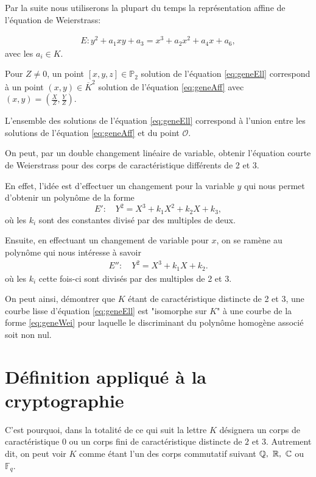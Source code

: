 Par la suite nous utiliserons la plupart du temps la représentation affine de
l'équation de Weierstrass:

\begin{align*}
    \label{eq:geneAff}
E : y^2 + a_1xy + a_3 = x^3 +a_2x^2+a_4x+a_6
,\end{align*}
avec les $a_{i} \in K$. 

Pour $Z \neq 0$, un point $[x,y,z] \in \mathbb{P}_{2}$ solution de l'équation
\eqref{eq:geneEll} correspond à un point $(x,y) \in \overline{K}^2$ solution de
l'équation \eqref{eq:geneAff} avec $(x,y)=(\frac{X}{Z},\frac{Y}{Z})$.

L'ensemble des solutions de l'équation \eqref{eq:geneEll} correspond à l'union entre les
solutions de l'équation \eqref{eq:geneAff} et du point $\mathcal{O}$.

On peut, par un double changement linéaire de variable, obtenir l'équation courte de Weierstrass
pour des corps de caractéristique différents de 2 et 3.

En effet, l'idée est d'effectuer un changement pour la variable $y$ qui nous permet
d'obtenir un polynôme de la forme
\[
E' :\quad Y^2 = X^3 + k_1X^2 + k_2X + k_3
,\] 
où les $k_{i}$ sont des constantes divisé par des multiples de deux.

Ensuite, en effectuant un changement de variable pour $x$, on se ramène au polynôme qui nous
intéresse à savoir 
\begin{align*}
    \label{eq:geneWei}
E'' :\quad Y^2 = X^3 + k_1X + k_2
.\end{align*}
où les $k_{i}$ cette fois-ci sont divisés par des multiples de 2 et 3.

On peut ainsi, démontrer que $K$ étant de caractéristique distincte de 2 et 3, une courbe
lisse d'équation \eqref{eq:geneEll} est "isomorphe sur $K$" à une courbe de la forme
\eqref{eq:geneWei} pour laquelle le discriminant du polynôme homogène
associé soit non nul. 

\section{Définition appliqué à la cryptographie}

C'est pourquoi, dans la totalité de ce qui suit la lettre $K$ désignera un corps de caractéristique $0$ ou un
corps fini de caractéristique distincte de $2$ et $3$. Autrement dit, on peut voir $K$
comme étant l'un des corps commutatif suivant $\mathbb{Q},\ \mathbb{R},\ \mathbb{C}$ ou $\mathbb{F}_{q}$.

